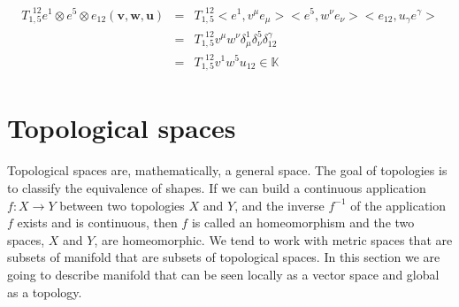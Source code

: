 \documentclass[final, paper=letter,5p,times,twocolumn]{elsarticle}
\theoremstyle{definition}
\begin{document}
\begin{eqnarray*}
  \begin{array}{rcl}
    T_{1,5}^{~~12}e^{1} \otimes e^{5}\otimes e_{12}(\bm{v}, \bm{w}, \bm{u}) & = & T_{1,5}^{~~12} <e^{1},v^{\mu}e_{\mu}><e^{5},w^{\nu}e_{\nu}><e_{12},u_{\gamma}e^{\gamma}> \\
    & = & T_{1,5}^{~~12} v^{\mu}w^{\nu} \delta_{\mu}^{1} \delta_{\nu}^{5} \delta_{12}^{\gamma} \\
    & = & T_{1,5}^{~~12} v^{1}w^{5}u_{12} \in \mathbb{K}
  \end{array}
\end{eqnarray*}



\section{Topological spaces}

Topological spaces are, mathematically, a general space. The goal of  topologies is to classify the equivalence of shapes. If we can build a continuous application $f : X \rightarrow Y$ between two topologies $X$ and $Y$, and the inverse $f^{-1}$ of the application $f$ exists and is continuous, then $f$ is called an homeomorphism and the two spaces, $X$ and $Y$, are homeomorphic.
We tend to work with metric spaces that are subsets of manifold that are subsets of topological spaces. In this section we are going to describe manifold that can be seen locally as a vector space and global as a topology.
\end{document}
